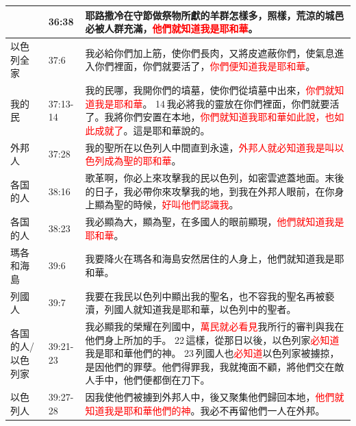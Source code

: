 \begin{table}[H]
\begin{tabular}{p{1.5cm}|p{}|p{13.0cm}}
&36:38&耶路撒冷在守節做祭物所獻的羊群怎樣多，照樣，荒涼的城邑必被人群充滿，\textcolor{red}{他們就知道我是耶和華}。\\\hline 



以色列全家&37:6&我必給你們加上筋，使你們長肉，又將皮遮蔽你們，使氣息進入你們裡面，你們就要活了，\textcolor{red}{你們便知道我是耶和華}。\\\hline

我的民&37:13-14&我的民哪，我開你們的墳墓，使你們從墳墓中出來，\textcolor{red}{你們就知道我是耶和華}。 14 我必將我的靈放在你們裡面，你們就要活了。我將你們安置在本地，\textcolor{red}{你們就知道我耶和華如此說，也如此成就了}。這是耶和華說的。\\\hline 


外邦人&37:28&我的聖所在以色列人中間直到永遠，\textcolor{red}{外邦人就必知道我是叫以色列成為聖的耶和華}。\\\hline 

各国的人&38:16&歌革啊，你必上來攻擊我的民以色列，如密雲遮蓋地面。末後的日子，我必帶你來攻擊我的地，到我在外邦人眼前，在你身上顯為聖的時候，\textcolor{red}{好叫他們認識我}。\\\hline 

各国的人&38:23&我必顯為大，顯為聖，在多國人的眼前顯現，\textcolor{red}{他們就知道我是耶和華}。\\\hline 

瑪各和海島&39:6&我要降火在瑪各和海島安然居住的人身上，他們就知道我是耶和華。\\\hline 

列國人&39:7&我要在我民以色列中顯出我的聖名，也不容我的聖名再被褻瀆，列國人就知道我是耶和華，以色列中的聖者。\\\hline 

各国的人/以色列家&39:21-23&我必顯我的榮耀在列國中，\textcolor{red}{萬民就必看見}我所行的審判與我在他們身上所加的手。 22 這樣，從那日以後，以色列家\textcolor{red}{必知道}我是耶和華他們的神。 23 列國人也\textcolor{red}{必知道}以色列家被擄掠，是因他們的罪孽。他們得罪我，我就掩面不顧，將他們交在敵人手中，他們便都倒在刀下。\\\hline 

以色列人&39:27-28&因我使他們被擄到外邦人中，後又聚集他們歸回本地，\textcolor{red}{他們就知道我是耶和華他們的神}。我必不再留他們一人在外邦。\\\hline 
\end{tabular}
\end{table}

